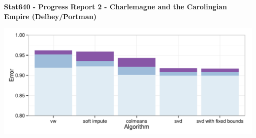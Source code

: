 \documentclass[oneside]{article}
\begin{document}
\begin{center}
\textbf{Stat640 - Progress Report 2 - Charlemagne and the Carolingian Empire (Delhey/Portman)}
\end{center}

\begin{center}
  \includegraphics[width = 0.75\linewidth]{vis}
\end{center}
\end{document}
